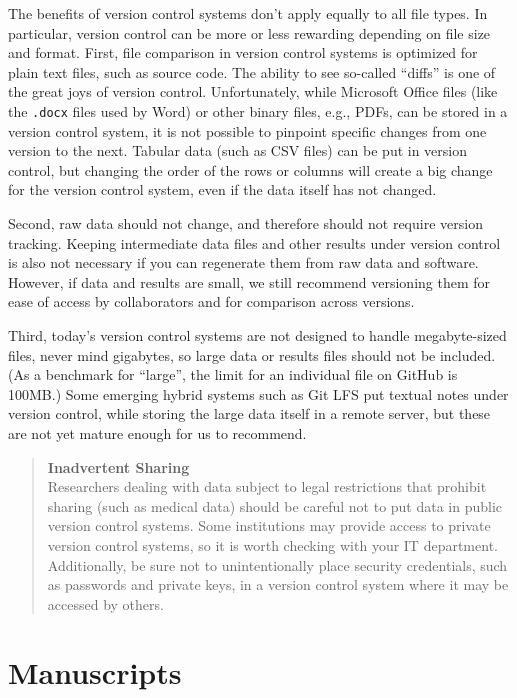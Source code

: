\documentclass[10pt,letterpaper]{article}
\newcommand{\withurl}[2]{{#1}}
\newcommand{\practicesection}[2]{\section{#1}\label{#2}}
\begin{document}
The benefits of version control systems don't apply equally to all
file types.  In particular, version control can be more or less
rewarding depending on file size and format.  First, file comparison
in version control systems is optimized for plain text files, such as
source code. The ability to see so-called ``diffs'' is one of the
great joys of version control. Unfortunately, while Microsoft
Office files (like the \texttt{.docx} files used by Word) or other
binary files, e.g., PDFs, can be stored in a version control system,
it is not possible to pinpoint specific changes from one version
to the next.  Tabular data (such as CSV files) can be put in version
control, but changing the order of the rows or columns will create a
big change for the version control system, even if the data itself has
not changed.

Second, raw data should not change, and therefore should not require
version tracking.  Keeping intermediate data files and other results
under version control is also not necessary if you can regenerate
them from raw data and software. However, if data and results are
small, we still recommend versioning them for ease of access by
collaborators and for comparison across versions.

Third, today's version control systems are not designed to handle
megabyte-sized files, never mind gigabytes, so large data or results
files should not be included.  (As a benchmark for ``large'', the
limit for an individual file on GitHub is 100MB.)  Some emerging
hybrid systems such as \withurl{Git LFS}{https://git-lfs.github.com/}
put textual notes under version control, while storing the large data
itself in a remote server, but these are not yet mature enough for us
to recommend.

\begin{quote}
  \noindent \textbf{Inadvertent Sharing}
  \\
  Researchers dealing with data subject to legal restrictions that
  prohibit sharing (such as medical data) should be careful not to put
  data in public version control systems. Some institutions may
  provide access to private version control systems, so it is worth
  checking with your IT department.
  \\
  Additionally, be sure not to unintentionally place security
  credentials, such as passwords and private keys, in a version
  control system where it may be accessed by others.
\end{quote}

\practicesection{Manuscripts}{sec:manuscripts}
\end{document}
